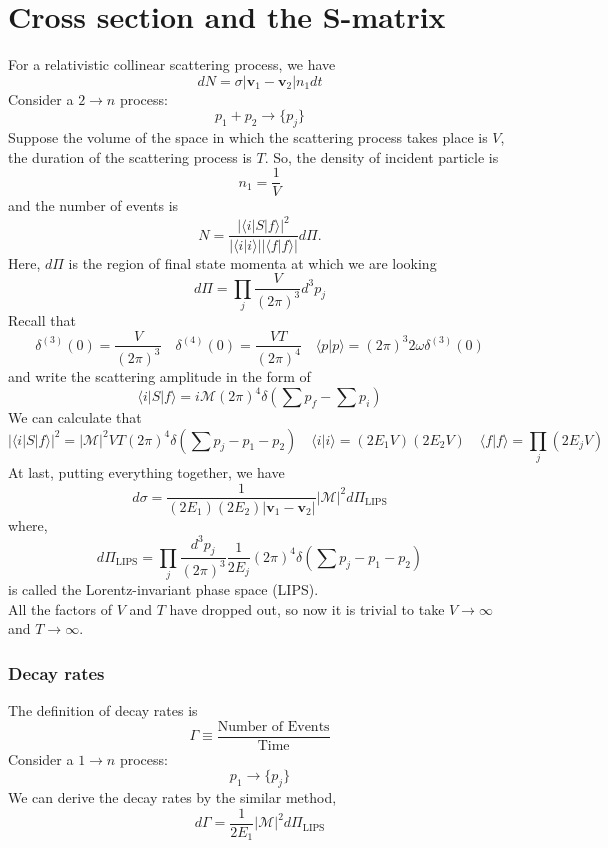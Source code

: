 \section{Cross section and the S-matrix}
\noindent
For a relativistic collinear scattering process, we have
\[dN = \sigma |\bm{v}_1 - \bm{v}_2| n_1 dt\]
Consider a  $2 \to n$ process:
\[p_1 + p_2 \to \{p_j\}\]
Suppose the volume of the space in which the scattering process takes place is $V$, the duration of the scattering process is $T$. 
So, the density of incident particle is
\[n_1 = \frac{1}{V}\]
and the number of events is
\[N = \frac{|\langle i | S | f \rangle|^2}{|\langle i | i \rangle||\langle f | f \rangle|} d\Pi .\]
Here, $d\Pi$ is the region of final state momenta at which we are looking
\[d\Pi = \prod_j \frac{V}{(2\pi)^3} d^3 p_j\]
Recall that
\[\delta^{(3)}(0) = \frac{V}{(2\pi)^3} \quad \delta^{(4)}(0) = \frac{VT}{(2\pi)^4} \quad \langle p | p \rangle = (2\pi)^3 2\omega \delta^{(3)}(0)\]
and write the scattering amplitude in the form of
\[\langle i | S | f \rangle = i\mathcal{M}(2\pi)^4\delta(\sum p_f-\sum p_i)\]
We can calculate that
\[|\langle i | S | f \rangle|^2 = |\mathcal{M}|^2 VT (2\pi)^4 \delta(\sum p_j - p_1 - p_2) \quad \langle i | i \rangle = (2E_1V) (2E_2V) \quad \langle f | f \rangle = \prod_j (2E_jV)\]
At last, putting everything together, we have
\[d\sigma = \frac{1}{(2E_1)(2E_2)|\bm{v}_1-\bm{v}_2|} |\mathcal{M}|^2 d\Pi_{\mathrm{LIPS}}\]
where,
\[d\Pi_{\mathrm{LIPS}} = \prod_j \frac{d^3p_j}{(2\pi)^3} \frac{1}{2E_j} (2\pi)^4 \delta(\sum p_j - p_1 - p_2)\]
is called the Lorentz-invariant phase space (LIPS). \\
All the factors of $V$ and $T$ have dropped out, so now it is trivial to take $V \to \infty$ and $T \to \infty$. 

\subsubsection{Decay rates}
\noindent
The definition of decay rates is
\[\Gamma \equiv \frac{\mbox{Number of Events}}{\mbox{Time}}\]
Consider a  $1 \to n$ process:
\[p_1 \to \{p_j\}\]
We can derive the decay rates by the similar method,
\[d\Gamma = \frac{1}{2E_1} |\mathcal{M}|^2 d\Pi_{\mathrm{LIPS}} \]

